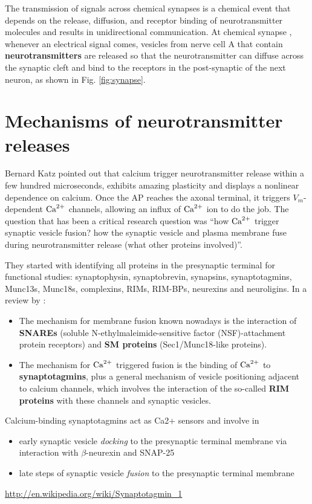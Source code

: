 The transmission of signals across chemical synapses is a chemical event that
depends on the release, diffusion, and receptor binding of neurotransmitter
molecules and results in unidirectional communication.
At chemical synapse , whenever an electrical signal comes, vesicles from nerve
cell A that contain {\bf neurotransmitters} are released so that the
neurotransmitter can diffuse across the synaptic cleft and bind to the receptors
in the post-synaptic of the next neuron, as shown in Fig.
\ref{fig:synapse}. 


\section{Mechanisms of neurotransmitter releases}
\label{sec:mechanism_neurotransmitter-release}

Bernard Katz pointed out that calcium trigger neurotransmitter release within a
few hundred microseconds, exhibits amazing plasticity and displays a nonlinear
dependence on calcium. Once the AP reaches the axonal terminal, it triggers
$V_m$-dependent ${\text{Ca}^{2+}}$ channels, allowing an influx of ${\text{Ca}^{2+}}$ ion to do the job.
The question that has been a critical research question was ``how ${\text{Ca}^{2+}}$ trigger synaptic vesicle fusion?
how the synaptic vesicle and plasma membrane fuse during neurotransmitter
release (what other proteins involved)''.

They started with identifying all proteins in the presynaptic terminal for
functional studies: synaptophysin, synaptobrevin, synapsins, synaptotagmins,
Munc13s, Munc18s, complexins, RIMs, RIM-BPs, neurexins and neuroligins.
In a review by \citep{sudhof2013}:
\begin{itemize}
  \item The mechanism for membrane fusion known nowadays is the interaction of {\bf
SNAREs} (soluble N-ethylmaleimide-sensitive factor (NSF)-attachment protein
receptors) and {\bf SM proteins} (Sec1/Munc18-like proteins).

  \item The mechanism for ${\text{Ca}^{2+}}$ triggered fusion is the binding of ${\text{Ca}^{2+}}$ to
{\bf synaptotagmins}, plus a general mechanism of vesicle
positioning adjacent to calcium channels, which involves the interaction of the
so-called {\bf RIM proteins} with these channels and synaptic vesicles.
\end{itemize}

Calcium-binding synaptotagmins act as Ca2+ sensors and involve in
\begin{itemize}
  \item early synaptic vesicle {\it docking} to the presynaptic terminal
  membrane via interaction with $\beta$-neurexin and SNAP-25
  
  \item late steps of synaptic vesicle {\it fusion} to the presynaptic terminal
  membrane
\end{itemize}
\url{http://en.wikipedia.org/wiki/Synaptotagmin_1}

